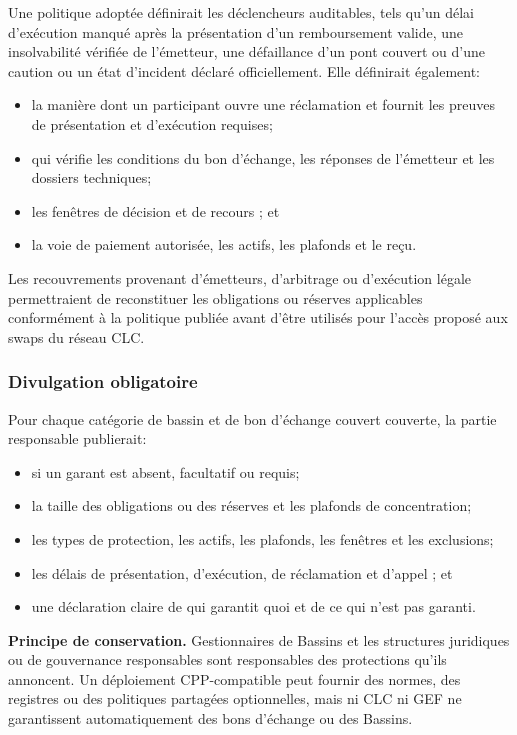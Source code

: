 \documentclass[11pt]{article}
\begin{document}
Une politique adoptée définirait les déclencheurs auditables, tels qu'un délai d'exécution manqué après la présentation d'un remboursement valide, une insolvabilité vérifiée de l'émetteur, une défaillance d'un pont couvert ou d'une caution ou un état d'incident déclaré officiellement. Elle définirait également:

\begin{itemize}[leftmargin=*]
\item la manière dont un participant ouvre une réclamation et fournit les preuves de présentation et d'exécution requises;
\item qui vérifie les conditions du bon d'échange, les réponses de l'émetteur et les dossiers techniques;
\item les fenêtres de décision et de recours ; et
\item la voie de paiement autorisée, les actifs, les plafonds et le reçu.
\end{itemize}
Les recouvrements provenant d'émetteurs, d'arbitrage ou d'exécution légale permettraient de reconstituer les obligations ou réserves applicables conformément à la politique publiée avant d'être utilisés pour l'accès proposé aux swaps du réseau CLC.

\subsubsection*{Divulgation obligatoire}

Pour chaque catégorie de bassin et de bon d'échange couvert couverte, la partie responsable publierait:

\begin{itemize}[leftmargin=*]
\item si un garant est absent, facultatif ou requis;
\item la taille des obligations ou des réserves et les plafonds de concentration;
\item les types de protection, les actifs, les plafonds, les fenêtres et les exclusions;
\item les délais de présentation, d'exécution, de réclamation et d'appel ; et
\item une déclaration claire de qui garantit quoi et de ce qui n'est pas garanti.
\end{itemize}
\textbf{Principe de conservation.} Gestionnaires de Bassins et les structures juridiques ou de gouvernance responsables sont responsables des protections qu'ils annoncent. Un déploiement CPP-compatible peut fournir des normes, des registres ou des politiques partagées optionnelles, mais ni CLC ni GEF ne garantissent automatiquement des bons d'échange ou des Bassins.
\end{document}
